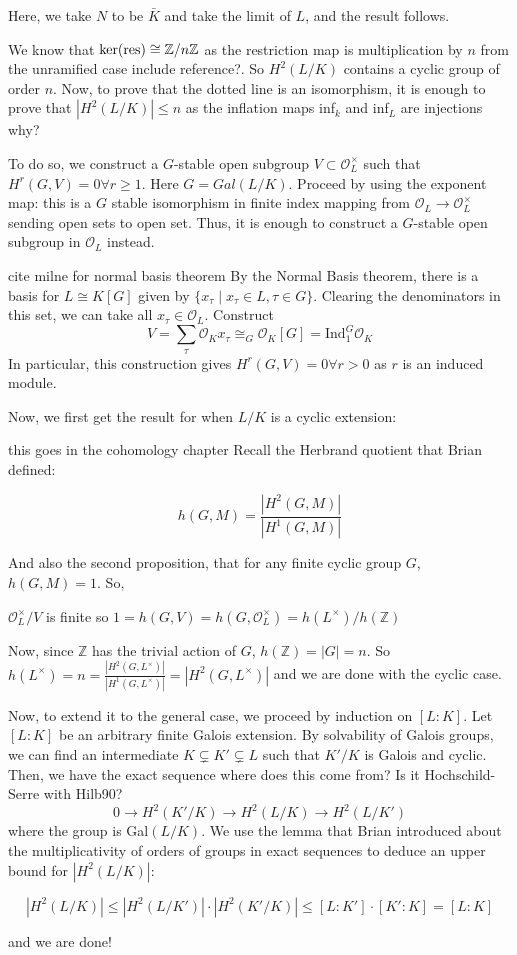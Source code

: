 \documentclass[class=article, crop=false]{standalone}
\begin{document}
Here, we take $N$ to be $\bar{K}$ and take the limit of $L$, and the result follows. 

We know that \(\ker(\text{res}) \cong \mathbb{Z} / n\mathbb{Z}\) 
as the restriction map is multiplication by \(n\) from the
unramified case {\color{red} include reference?}.
So $H^2(L/K)$ contains a cyclic group of order $n$.
Now, to prove that the dotted line is an isomorphism, 
it is enough to prove that 
$|H^2(L/K)|\leq n$ as the inflation maps 
inf$_k$ and inf$_L$ are injections {\color{red} why?}

To do so, we construct a $G$-stable open subgroup $V\subset \mathcal{O}_L^\times$ such that $H^r(G, V)=0\forall r\geq 1$. Here $G=Gal(L/K).$ Proceed by using the exponent map: this is a $G$ stable isomorphism in finite index mapping from $\mathcal{O}_L\rightarrow\mathcal{O}_L^\times$ sending open sets to open set. Thus, it is enough to construct a $G$-stable open subgroup in $\mathcal{O}_L$ instead. 

{\color{red} cite milne for normal basis theorem}
By the Normal Basis theorem, there is a basis for $L\cong K[G]$ given by $\{x_\tau \mid x_\tau\in L, \tau\in G\}$. Clearing the denominators in this set, we can take all $x_\tau\in \mathcal{O}_L$. Construct $$V=\sum_\tau \mathcal{O}_Kx_\tau\cong_G\mathcal{O}_K[G]=\text{Ind}_1^G\mathcal{O}_K$$ 
In particular, this construction gives $H^r(G,V)=0\forall r>0$ as $r$ is an induced module. 

Now, we first get the result for when $L/K$ is a cyclic extension: 

{\color{red} this goes in the cohomology chapter}
Recall the Herbrand quotient that Brian defined:

$$h(G,M)=\frac{|H^2(G,M)|}{|H^1(G,M)|}$$

And also the second proposition, that for any finite cyclic group $G$, $h(G,M)=1$. So,

$\mathcal{O}_L^\times/V$ is finite so $1=h(G, V)=h(G, \mathcal{O}_L^\times)=h(L^\times)/h(\mathbb{Z})$

Now, since $\mathbb{Z}$ has the trivial action of $G$, $h(\mathbb{Z})=|G|=n$. So $h(L^\times)=n=\frac{|H^2(G,L^\times)|}{|H^1(G,L^\times)|}=|H^2(G,L^\times)|$ and we are done with the cyclic case. 

Now, to extend it to the general case, we proceed by induction on $[L:K]$. Let $[L:K]$ be an arbitrary finite Galois extension. By solvability of Galois groups, we can find an intermediate $K\subsetneq K'\subsetneq L$ such that $K'/K$ is Galois and cyclic. 
Then, we have the exact sequence 
{\color{red} where does this come from? 
Is it Hochschild-Serre with Hilb90?}
$$0\rightarrow H^2(K'/K)\rightarrow H^2(L/K)\rightarrow H^2(L/K')$$ 
where the group is Gal$(L/K)$. We use the lemma that Brian introduced about the multiplicativity of orders of groups in exact sequences to deduce an upper bound for $|H^2(L/K)|:$


$$|H^2(L/K)|\leq |H^2(L/K')|\cdot|H^2(K'/K)|\leq [L:K']\cdot[K':K]=[L:K]$$

and we are done!
\end{document}
